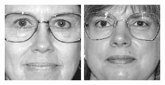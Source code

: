 \begin{figure}[ht]
\begin{center}
  \includegraphics[width=\columnwidth/10]{ch5/figures/feret31.jpg}
  \includegraphics[width=\columnwidth/10]{ch5/figures/feret32.jpg}

\end{center}
\end{figure}
